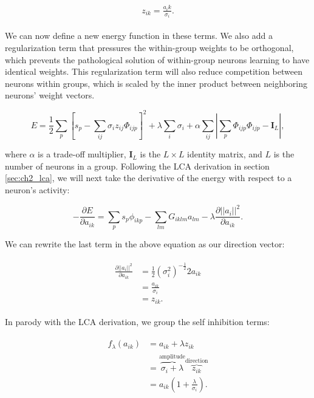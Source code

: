 \begin{align}\label{eq:ch3_z_def}
\begin{split}
  z_{ik} = \frac{a_ik}{\sigma_{i}}.
\end{split}
\end{align}

We can now define a new energy function in these terms. We also add a regularization term that pressures the within-group weights to be orthogonal, which prevents the pathological solution of within-group neurons learning to have identical weights. This regularization term will also reduce competition between neurons within groups, which is scaled by the inner product between neighboring neurons' weight vectors.

\begin{equation}\label{eq:ch3_subspace_lca_energy}
    E = \frac{1}{2}\sum_{p}\left[s_{p} - \sum_{ij}\sigma_{i}z_{ij}\Phi_{ijp}\right]^{2} + \lambda \sum_{i}\sigma_{i} + \alpha \sum_{ij}\left|\sum_{p} \Phi_{ijp}\Phi_{ijp} - \mathbf{I}_{L} \right|,
\end{equation}

\noindent where $\alpha$ is a trade-off multiplier, $\mathbf{I}_{L}$ is the $L \times L$ identity matrix, and $L$ is the number of neurons in a group. Following the LCA derivation in section \ref{sec:ch2_lca}, we will next take the derivative of the energy with respect to a neuron's activity:

\begin{equation}\label{eq:ch3_subspace_deda}
    -\frac{\partial E}{\partial a_{ik}} = \sum_{p}s_{p}\phi_{ikp} - \sum_{lm}G_{iklm}a_{lm} - \lambda \frac{\partial ||a_{i}||^{2}}{\partial a_{ik}}.
\end{equation}

We can rewrite the last term in the above equation as our direction vector:

\begin{align}\label{eq:ch3_subspace_deda_to_z}
\begin{split}
    \frac{\partial ||a_{i}||^{2}}{\partial a_{ik}} &= \frac{1}{2}\left(\sigma_{i}^{2}\right)^{-\tfrac{1}{2}}2a_{ik}\\
    &= \frac{a_{ik}}{\sigma_{i}}\\
    &= z_{ik}.
\end{split}
\end{align}

In parody with the LCA derivation, we group the self inhibition terms:

\begin{align}\label{eq:ch3_f_of_a}
\begin{split}
    f_{\lambda}(a_{ik}) &= a_{ik} + \lambda z_{ik}\\
    &= \overbrace{\sigma_{i}+\lambda}^\text{amplitude} \overbrace{z_{ik}}^\text{direction}\\
    &= a_{ik}(1 + \frac{\lambda}{\sigma_{i}}).
\end{split}
\end{align}

